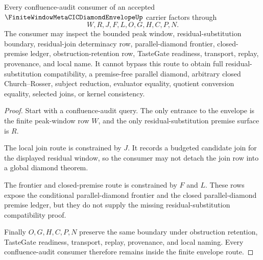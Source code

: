 \begin{theorem}
\label{thm:finite-window-metacic-diamond-envelope-handoff}
Every confluence-audit consumer of an accepted $\FiniteWindowMetaCICDiamondEnvelopeUp$ carrier factors through
$$
W,R,J,F,L,O,G,H,C,P,N .
$$
The consumer may inspect the bounded peak window, residual-substitution boundary, residual-join determinacy row, parallel-diamond frontier, closed-premise ledger, obstruction-retention row, TasteGate readiness, transport, replay, provenance, and local name. It cannot bypass this route to obtain full residual-substitution compatibility, a premise-free parallel diamond, arbitrary closed Church--Rosser, subject reduction, evaluator equality, quotient conversion equality, selected joins, or kernel consistency.
\end{theorem}
\begin{proof}
Start with a confluence-audit query. The only entrance to the envelope is the finite peak-window row $W$, and the only residual-substitution premise surface is $R$.

The local join route is constrained by $J$. It records a budgeted candidate join for the displayed residual window, so the consumer may not detach the join row into a global diamond theorem.

The frontier and closed-premise route is constrained by $F$ and $L$. These rows expose the conditional parallel-diamond frontier and the closed parallel-diamond premise ledger, but they do not supply the missing residual-substitution compatibility proof.

Finally $O,G,H,C,P,N$ preserve the same boundary under obstruction retention, TasteGate readiness, transport, replay, provenance, and local naming. Every confluence-audit consumer therefore remains inside the finite envelope route.
\end{proof}

